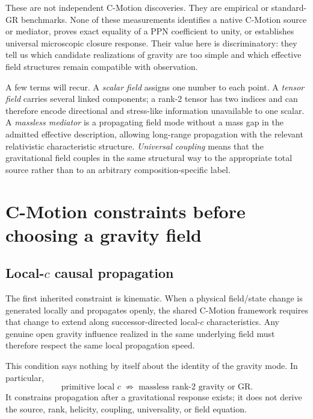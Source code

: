 \documentclass[11pt]{article}
\newcommand{\cmotion}{\mbox{C-Motion}}
\theoremstyle{plain}
\theoremstyle{remark}
\begin{document}
These are not independent \cmotion{} discoveries.  They are empirical or standard-GR
benchmarks.  None of these measurements identifies a native C-Motion
source or mediator, proves exact equality of a PPN coefficient to unity,
or establishes universal microscopic closure response.  Their value here is discriminatory: they tell us which candidate
realizations of gravity are too simple and which effective field structures remain
compatible with observation.

A few terms will recur.  A \emph{scalar field} assigns one number to each point.  A
\emph{tensor field} carries several linked components; a rank-2 tensor has two indices and
can therefore encode directional and stress-like information unavailable to one scalar.
A \emph{massless mediator} is a propagating field mode without a mass gap in the admitted
effective description, allowing long-range propagation with the relevant relativistic
characteristic structure.  \emph{Universal coupling} means that the gravitational field
couples in the same structural way to the appropriate total source rather than to an
arbitrary composition-specific label.

\section{C-Motion constraints before choosing a gravity field}
\label{sec:constraints}

\subsection{Local-\texorpdfstring{$c$}{c} causal propagation}

The first inherited constraint is kinematic.  When a physical field/state change is
generated locally and propagates openly, the shared \cmotion{} framework requires that
change to extend along successor-directed local-$c$ characteristics.  Any genuine open
gravity influence realized in the same underlying field must therefore respect the same
local propagation speed.

This condition says nothing by itself about the identity of the gravity mode.  In
particular,
\begin{equation}
\boxed{
\text{primitive local }c
\;\not\Rightarrow\;
\text{massless rank-2 gravity or GR}.}
\label{eq:localc-not-rank2}
\end{equation}
It constrains propagation after a gravitational response exists; it does not derive the
source, rank, helicity, coupling, universality, or field equation.
\end{document}
